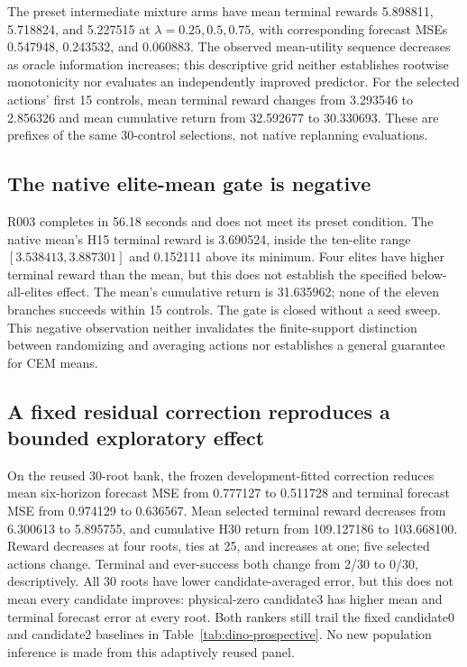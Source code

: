 \documentclass[11pt]{article}
\begin{document}
The preset intermediate mixture arms have mean terminal rewards 5.898811,
5.718824, and 5.227515 at $\lambda=0.25,0.5,0.75$, with corresponding
forecast MSEs 0.547948, 0.243532, and 0.060883. The observed mean-utility
sequence decreases as oracle information increases; this descriptive grid
neither establishes rootwise monotonicity nor evaluates an independently
improved predictor. For the selected actions' first 15 controls, mean terminal
reward changes from 3.293546 to 2.856326 and mean cumulative return from
32.592677 to 30.330693. These are prefixes of the same 30-control selections,
not native replanning evaluations.

\subsection{The native elite-mean gate is negative}
\label{sec:r003}
R003 completes in 56.18 seconds and does not meet its preset condition.
The native mean's H15 terminal reward is 3.690524, inside the ten-elite
range $[3.538413,3.887301]$ and 0.152111 above its minimum. Four elites
have higher terminal reward than the mean, but this does not establish the
specified below-all-elites effect. The mean's cumulative return is 31.635962;
none of the eleven branches succeeds within 15 controls. The gate is closed
without a seed sweep. This negative observation neither invalidates the
finite-support distinction between randomizing and averaging actions nor
establishes a general guarantee for CEM means.

\subsection{A fixed residual correction reproduces a bounded exploratory effect}
\label{sec:r004}
On the reused 30-root bank, the frozen development-fitted correction reduces
mean six-horizon forecast MSE from 0.777127 to 0.511728 and terminal forecast
MSE from 0.974129 to 0.636567. Mean selected terminal reward decreases from
6.300613 to 5.895755, and cumulative H30 return from 109.127186 to 103.668100.
Reward decreases at four roots, ties at 25, and increases at one; five
selected actions change. Terminal and ever-success both change from 2/30 to
0/30, descriptively. All 30 roots have lower candidate-averaged error, but
this does not mean every candidate improves: physical-zero candidate3 has
higher mean and terminal forecast error at every root. Both rankers still
trail the fixed candidate0 and candidate2 baselines in
Table~\ref{tab:dino-prospective}. No new population inference is made from
this adaptively reused panel.
\end{document}
